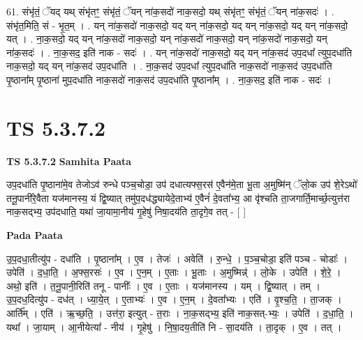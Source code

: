 \documentclass[17pt]{extarticle}
\begin{document}
61. संभृ॑तं॒ ॅयद् यथ् संभृ॑तꣳ॒॒ संभृ॑तं॒ ॅयन् ना॑क॒सदो॑ नाक॒सदो॒ यथ् संभृ॑तꣳ॒॒ संभृ॑तं॒ ॅयन् ना॑क॒सदः॑ । . संभृ॑त॒मिति॒ सं - भृ॒त॒म् । . यन् ना॑क॒सदो॑ नाक॒सदो॒ यद् यन् ना॑क॒सदो॒ यद् यन् ना॑क॒सदो॒ यद् यन् ना॑क॒सदो॒ यत् । . ना॒क॒सदो॒ यद् यन् ना॑क॒सदो॑ नाक॒सदो॒ यन् ना॑क॒सदो॑ नाक॒सदो॒ यन् ना॑क॒सदो॑ नाक॒सदो॒ यन् ना॑क॒सदः॑ । . ना॒क॒सद॒ इति॑ नाक - सदः॑ । . यन् ना॑क॒सदो॑ नाक॒सदो॒ यद् यन् ना॑क॒सद॑ उप॒दधा᳚ त्युप॒दधा॑ति नाक॒सदो॒ यद् यन् ना॑क॒सद॑ उप॒दधा॑ति । . ना॒क॒सद॑ उप॒दधा᳚ त्युप॒दधा॑ति नाक॒सदो॑ नाक॒सद॑ उप॒दधा॑ति पृ॒ष्ठाना᳚म् पृ॒ष्ठाना॑ मुप॒दधा॑ति नाक॒सदो॑ नाक॒सद॑ उप॒दधा॑ति पृ॒ष्ठाना᳚म् । . ना॒क॒सद॒ इति॑ नाक - सदः॑ । \newline
\pagebreak
{}

\section{ TS 5.3.7.2 }

\textbf{TS 5.3.7.2 } \newline
\textbf{Samhita Paata} \newline

उप॒दधा॑ति पृ॒ष्ठाना॑मे॒व तेजोऽव॑ रुन्धे पञ्च॒चोडा॒ उप॑ दधात्यफ्स॒रस॑ ए॒वैन॑मे॒ता भू॒ता अ॒मुष्मि॑न् ॅलो॒क उप॑ शे॒रेऽथो॑ तनू॒पानी॑रे॒वैता यज॑मानस्य॒ यं द्वि॒ष्यात् तमु॑प॒दध॑द्ध्यायेदे॒ताभ्य॑ ए॒वैनं॑ दे॒वता᳚भ्य॒ आ वृ॑श्चति ता॒जगार्ति॒मार्च्छ॒त्युत्त॑रा नाक॒सद्भ्य॒ उप॑दधाति॒ यथा॑ जा॒यामा॒नीय॑ गृ॒हेषु॑ निषा॒दय॑ति ता॒दृगे॒व तत् - [  ] \newline

\textbf{Pada Paata} \newline

उ॒प॒दधा॒तीत्यु॑प - दधा॑ति । पृ॒ष्ठाना᳚म् । ए॒व । तेजः॑ । अवेति॑ । रु॒न्धे॒ । प॒ञ्च॒चोडा॒ इति॑ पञ्च - चोडाः᳚ । उपेति॑ । द॒धा॒ति॒ । अ॒फ्स॒रसः॑ । ए॒व । ए॒न॒म् । ए॒ताः । भू॒ताः । अ॒मुष्मिन्न्॑ । लो॒के । उपेति॑ । शे॒रे॒ । अथो॒ इति॑ । त॒नू॒पानी॒रिति॑ तनू - पानीः᳚ । ए॒व । ए॒ताः । यज॑मानस्य । यम् । द्वि॒ष्यात् । तम् । उ॒प॒दध॒दित्यु॑प - दध॑त् । ध्या॒ये॒त् । ए॒ताभ्यः॑ । ए॒व । ए॒न॒म् । दे॒वता᳚भ्यः । एति॑ । वृ॒श्च॒ति॒ । ता॒जक् । आर्ति᳚म् । एति॑ । ऋ॒च्छ॒ति॒ । उत्त॑रा॒ इत्युत् - त॒राः । ना॒क॒सद्भ्य॒ इति॑ नाक॒सत्-भ्यः॒ । उपेति॑ । द॒धा॒ति॒ । यथा᳚ । जा॒याम् । आ॒नीयेत्या᳚ - नीय॑ । गृ॒हेषु॑ । नि॒षा॒दय॒तीति॑ नि - सा॒दय॑ति । ता॒दृक् । ए॒व । तत् ।  \newline
\end{document}
